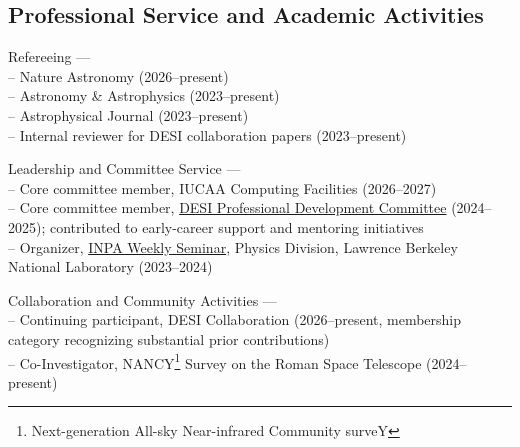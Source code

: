 \documentclass[12pt,letterpaper]{article}
\begin{document}

\vspace{-2mm}
\vspace{-1.5mm}
\subsection{Professional Service and Academic Activities}
\begin{list}{}{\cvlist}
\item Refereeing --- \\
-- Nature Astronomy (2026--present)\\
-- Astronomy \& Astrophysics (2023--present)\\
-- Astrophysical Journal (2023--present)\\
-- Internal reviewer for DESI collaboration papers (2023--present)

\item Leadership and Committee Service --- \\
-- Core committee member, IUCAA Computing Facilities (2026--2027)\\
-- Core committee member, \href{https://desi.lbl.gov/trac/wiki/PublicPages/Contacts#ProfessionalDevelopmentCommittee}{DESI Professional Development Committee} (2024--2025); contributed to early-career support and mentoring initiatives\\
-- Organizer, \href{https://inpa.lbl.gov/events/}{INPA Weekly Seminar}, Physics Division, Lawrence Berkeley National Laboratory (2023--2024)

\item Collaboration and Community Activities --- \\
-- Continuing participant, DESI Collaboration (2026--present, membership category recognizing substantial prior contributions)\\
-- Co-Investigator, NANCY\footnote{Next-generation All-sky Near-infrared Community surveY} Survey on the Roman Space Telescope (2024--present)
\end{list}
\end{document}
